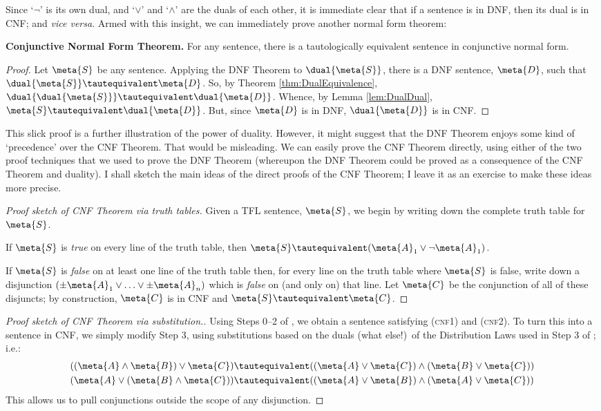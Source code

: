 Since `$\lnot$' is its own dual, and `$\lor$' and `$\land$' are the duals of each other, it is immediate clear that if a sentence is in DNF, then its dual is in CNF; and \emph{vice versa}. Armed with this insight, we can immediately prove another normal form theorem:
	\begin{thm}\label{thm:cnf}\textbf{Conjunctive Normal Form Theorem.} For any sentence, there is a tautologically equivalent sentence in conjunctive normal form.
\begin{proof}
	Let $\meta{S}$ be any sentence. Applying the DNF Theorem to $\dual{\meta{S}}$, there is a DNF sentence, $\meta{D}$, such that $\dual{\meta{S}} \tautequivalent \meta{D}$. So, by Theorem \ref{thm:DualEquivalence}, $\dual{\dual{\meta{S}}} \tautequivalent \dual{\meta{D}}$. Whence, by Lemma \ref{lem:DualDual}, $\meta{S} \tautequivalent \dual{\meta{D}}$. But, since $\meta{D}$ is in DNF, $\dual{\meta{D}}$ is in CNF. 	
\end{proof}
\end{thm}\noindent
This slick proof is a further illustration of the power of duality. However, it might suggest that the DNF Theorem enjoys some kind of `precedence' over the CNF Theorem. That would be misleading.  We can easily prove the CNF Theorem directly, using either of the two proof techniques that we used to prove the DNF Theorem (whereupon the DNF Theorem could be proved as a consequence of the CNF Theorem and duality). I shall sketch the main ideas of the direct proofs of the CNF Theorem; I leave it as an exercise to make these ideas more precise.
\begin{proof}[Proof sketch of CNF Theorem via truth tables]
	Given a TFL sentence, $\meta{S}$, we begin by writing down the complete truth table for $\meta{S}$.
	
	If $\meta{S}$ is \emph{true} on every line of the truth table, then $\meta{S} \tautequivalent (\meta{A}_1 \lor \lnot \meta{A}_1)$.
	
	If $\meta{S}$ is \emph{false} on at least one line of the truth table then, for every line on the truth table where $\meta{S}$ is false, write down a disjunction $(\pm\meta{A}_1 \lor \ldots \lor \pm\meta{A}_n)$ which is \emph{false} on (and only on) that line. Let $\meta{C}$ be the conjunction of all of these disjuncts; by construction, $\meta{C}$ is in CNF and $\meta{S} \tautequivalent \meta{C}$.
\end{proof}
\begin{proof}[Proof sketch of CNF Theorem via substitution.] Using Steps 0--2 of \intoDNF, we  obtain a sentence satisfying (\textsc{cnf1}) and (\textsc{cnf2}). To turn this into a sentence in CNF, we simply modify Step 3, using substitutions based on the duals (what else!)\ of the Distribution Laws used in Step 3 of \intoDNF{}; i.e.:
	\begin{align*}
		((\meta{A} \land \meta{B}) \lor \meta{C}) &\tautequivalent ((\meta{A} \lor \meta{C}) \land (\meta{B} \lor \meta{C}))\\
		(\meta{A} \lor (\meta{B} \land \meta{C})) &\tautequivalent ((\meta{A} \lor \meta{B}) \land (\meta{A} \lor \meta{C}))	
	\end{align*}
This allows us to pull conjunctions outside the scope of any disjunction.
\end{proof}\noindent
